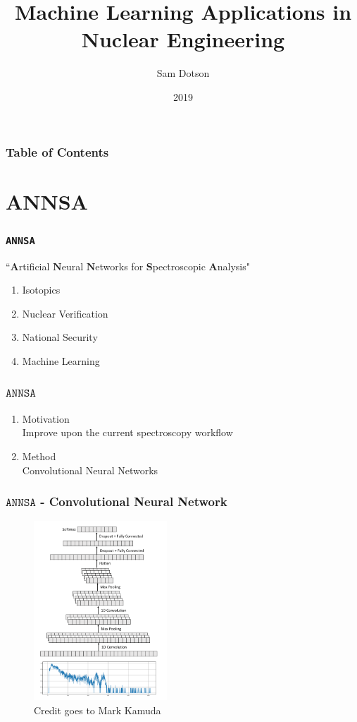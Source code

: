 \documentclass{beamer}
\title{Machine Learning Applications in Nuclear Engineering}
\author{Sam Dotson}
\institute{University of Illinois at Urbana-Champaign}
\date{2019}
\begin{document}
\frame{\titlepage}
	\begin{frame}
		\frametitle{Table of Contents}
		\tableofcontents
	\end{frame}

	\section{ANNSA}

	\begin{frame}
		\frametitle{\texttt{ANNSA}}
		``$\textbf{A}$rtificial $\textbf{N}$eural $\textbf{N}$etworks for $\textbf{S}$pectroscopic $\textbf{A}$nalysis"\\
		\begin{enumerate}
			\item Isotopics
			\item Nuclear Verification
			\item National Security 
			\item Machine Learning
		\end{enumerate}
	\end{frame}	
	\begin{frame}
		\frametitle{$\texttt{ANNSA}$}
		\begin{enumerate}
			\item Motivation\\
			Improve upon the current spectroscopy workflow
			\item Method\\
			Convolutional Neural Networks
		\end{enumerate} 
	\end{frame}
	\begin{frame}
		\frametitle{$\texttt{ANNSA}$ - Convolutional Neural Network}
		\begin{figure}
			\includegraphics[width=5cm]{cnn-figure.png}
			\caption{Credit goes to Mark Kamuda}
		\end{figure}
	\end{frame}
\end{document}
